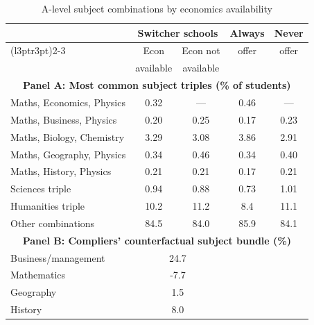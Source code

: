 \begin{table}[htbp]
\centering
\caption{A-level subject combinations by economics availability}
\label{tab:subject_triples}
\begin{tabular}{l cc cc}
\toprule
                                  & \multicolumn{2}{c}{Switcher schools}  & Always     & Never      \\
\cmidrule(l{3pt}r{3pt}){2-3}
                                  & Econ        & Econ not    & offer      & offer      \\
                                  & available   & available   &            &            \\
\midrule
\multicolumn{5}{c}{\textbf{Panel A: Most common subject triples (\% of students)}} \\
\midrule
Maths, Economics, Physics         & 0.32          & ---         & 0.46         & ---        \\
Maths, Business, Physics          & 0.20          & 0.25          & 0.17         & 0.23         \\
Maths, Biology, Chemistry          & 3.29          & 3.08          & 3.86         & 2.91         \\
Maths, Geography, Physics         & 0.34          & 0.46          & 0.34         & 0.40         \\
Maths, History, Physics           & 0.21          & 0.21          & 0.17         & 0.21         \\
Sciences triple                   & 0.94          & 0.88          & 0.73         & 1.01         \\
Humanities triple                 & 10.2          & 11.2          & 8.4         & 11.1         \\
Other combinations                & 84.5          & 84.0          & 85.9         & 84.1       \\
\midrule
\multicolumn{5}{c}{\textbf{Panel B: Compliers' counterfactual subject bundle (\%)}} \\
\midrule
Business/management               & \multicolumn{2}{c}{24.7}                &            &            \\
Mathematics                       & \multicolumn{2}{c}{-7.7}                &            &            \\
Geography                         & \multicolumn{2}{c}{1.5}                &            &            \\
History                           & \multicolumn{2}{c}{8.0}                &            &            \\

\end{tabular}
\end{table}
